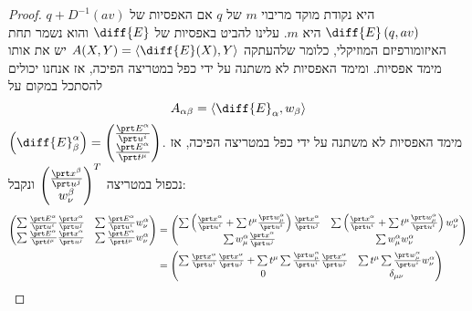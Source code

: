 \documentclass{article}
\theoremstyle{definition}
\begin{document}
	\begin{proof}
		\(q+D^{-1}(av)\)
		היא נקודת מוקד מריבוי \(m\) של \(q\) אם האפסיות של
		\(\diff{E}\left(q,av\right)\)
		היא \(m\).
		עלינו להביט באפסיות של
		\(\diff{E}\)
		והוא נשמר תחת האיזומורפיזם המוזיקלי, כלומר שלהעתקה
		\(A(X,Y)=\left\langle \diff{E}(X),Y \right\rangle\)
		יש את אותו מימד אפסיות.
		ומימד האפסיות לא משתנה על ידי כפל במטריצה הפיכה, אז אנחנו יכולים להסתכל במקום על
		\[
			A_{\alpha\beta}
			= \left\langle \diff{E}_\alpha, w_\beta \right\rangle
		\]
		\(
			\left(\diff{E}^\alpha_\beta\right)
			= \begin{pmatrix}
				\frac{\prt E^\alpha}{\prt u^i}
				\\ \frac{\prt E^\alpha}{\prt t^\mu}
			\end{pmatrix}
		\).
		מימד האפסיות לא משתנה על ידי כפל במטריצה הפיכה, אז נכפול במטריצה
		\(
			\begin{pmatrix}
				\frac{\prt x^\beta}{\prt u^j}
				\\ w^\beta_\nu
			\end{pmatrix}^T
		\)
		ונקבל:
		\begin{equation*}\begin{split}
			\begin{pmatrix}
				\sum \frac{\prt E^\alpha}{\prt u^i} \frac{\prt x^\alpha}{\prt u^j}
				& \sum \frac{\prt E^\alpha}{\prt u^i} w^\alpha_\nu
				\\
				\sum \frac{\prt E^\alpha}{\prt t^\mu} \frac{\prt x^\alpha}{\prt u^j}
				& \sum \frac{\prt E^\alpha}{\prt t^\mu} w^\alpha_\nu
			\end{pmatrix}
			&= 
			\begin{pmatrix}
				\sum \left(\frac{\prt x^\alpha}{\prt u^i} + \sum t^\mu \frac{\prt w_\mu^\alpha}{\prt u^i}\right) \frac{\prt x^\alpha}{\prt u^j}
				& \sum \left(\frac{\prt x^\alpha}{\prt u^i} + \sum t^\mu \frac{\prt w_\mu^\alpha}{\prt u^i}\right) w^\alpha_\nu
				\\
				\sum w^\alpha_\mu \frac{\prt x^\alpha}{\prt u^j}
				& \sum w^\alpha_\mu w^\alpha_\nu
			\end{pmatrix}
			\\&= 
			\begin{pmatrix}
				\sum \frac{\prt x^\alpha}{\prt u^i} \frac{\prt x^\alpha}{\prt u^j} + \sum t^\mu \sum \frac{\prt w_\mu^\alpha}{\prt u^i} \frac{\prt x^\alpha}{\prt u^j}
				& \sum t^\mu \sum \frac{\prt w_\mu^\alpha}{\prt u^i} w^\alpha_\nu
				\\
				0
				& \delta_{\mu\nu}
			\end{pmatrix}
		\end{split}\end{equation*}

\end{proof}
\end{document}
